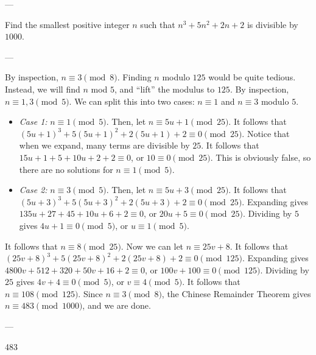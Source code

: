 
---

Find the smallest positive integer $n$ such that $n^3+5n^2+2n+2$ is divisible by $1000$. 

---

By inspection, $n\equiv 3\pmod{8}$. Finding $n$ modulo $125$ would be quite tedious. Instead, we will find $n$ mod $5$, and \enquote{lift} the modulus to $125$. By inspection, $n\equiv 1,3\pmod{5}$. We can split this into two cases: $n\equiv 1$ and $n\equiv 3$ modulo $5$.
\begin{itemize}
\item \textit{Case 1:} $n\equiv 1\pmod{5}$. Then, let $n\equiv 5u+1\pmod{25}$. It follows that $(5u+1)^3+5(5u+1)^2+2(5u+1)+2\equiv 0\pmod{25}$. Notice that when we expand, many terms are divisible by $25$. It follows that $15u+1+5+10u+2+2\equiv 0$, or $10\equiv 0\pmod{25}$. This is obviously false, so there are no solutions for $n\equiv 1\pmod{5}$.
\item \textit{Case 2:} $n\equiv 3\pmod{5}$. Then, let $n\equiv 5u+3\pmod{25}$. It follows that $(5u+3)^3+5(5u+3)^2+2(5u+3)+2\equiv 0\pmod{25}$. Expanding gives $135u+27+45+10u+6+2\equiv 0$, or $20u+5\equiv 0\pmod{25}$. Dividing by $5$ gives $4u+1\equiv 0\pmod{5}$, or $u\equiv 1\pmod{5}$.
\end{itemize}
It follows that $n\equiv 8\pmod{25}$. Now we can let $n\equiv 25v+8$. It follows that $(25v+8)^3+5(25v+8)^2+2(25v+8)+2\equiv 0\pmod{125}$. Expanding gives $4800v+512+320+50v+16+2\equiv 0$, or $100v+100\equiv 0\pmod{125}$. Dividing by $25$ gives $4v+4\equiv 0\pmod{5}$, or $v\equiv 4\pmod{5}$. It follows that $n\equiv 108\pmod{125}$. Since $n\equiv 3\pmod{8}$, the Chinese Remainder Theorem gives $n\equiv 483\pmod{1000}$, and we are done.

---

483
